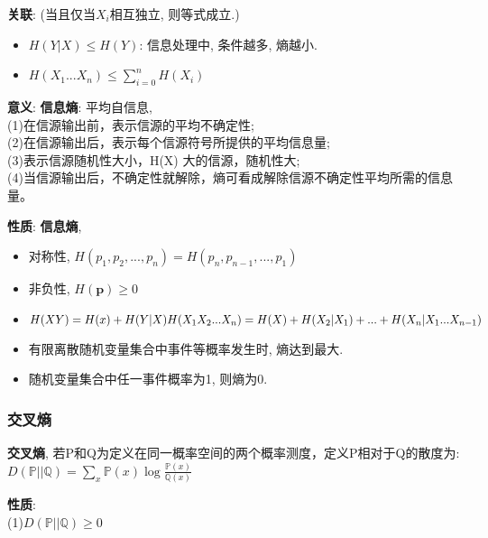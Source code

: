 \documentclass{article}
\begin{document}
            \textbf{关联}: (当且仅当$X_i$相互独立, 则等式成立.)
            \begin{itemize}
                \item $H(Y|X) \le H(Y)$: 信息处理中, 条件越多, 熵越小.
                \item $H(X_1...X_n) \le \sum\limits_{i=0}^n H(X_i)$
            \end{itemize}
            
            \textbf{意义}: \textbf{信息熵}: 平均自信息, \\
            (1)在信源输出前，表示信源的平均不确定性;\\
            (2)在信源输出后，表示每个信源符号所提供的平均信息量;\\
            (3)表示信源随机性大小，H(X) 大的信源，随机性大;\\
            (4)当信源输出后，不确定性就解除，熵可看成解除信源不确定性平均所需的信息量。
            
            \textbf{性质}: \textbf{信息熵}, 
            \begin{itemize}
                \item 对称性, $H(p_1, p_2, ..., p_n) = H(p_n, p_{n-1}, ..., p_1)$
                \item 非负性, $H(\boldsymbol p) \ge 0$
                \item $H(XY) = H(x) + H(Y|X) \\ H(X_1 X_2 ... X_n) = H(X) + H(X_2|X_1) + ... + H(X_n|X_1...X_{n-1})$
                \item 有限离散随机变量集合中事件等概率发生时, 熵达到最大.
                \item 随机变量集合中任一事件概率为1, 则熵为0.
            \end{itemize}
            
        \subsubsection{交叉熵}
            \textbf{交叉熵}, 若P和Q为定义在同一概率空间的两个概率测度，定义P相对于Q的散度为: $D(\mathbb P || \mathbb Q)=\sum\limits_x \mathbb P(x) \log \frac{\mathbb P(x)}{\mathbb Q(x)}$
            
            \textbf{性质}:\\
                (1)$D(\mathbb P || \mathbb Q) \ge 0$
\end{document}
